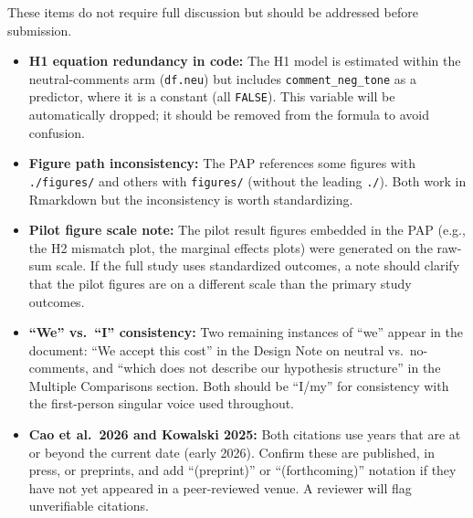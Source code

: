 \documentclass[11pt]{article}
\begin{document}
These items do not require full discussion but should be addressed before submission.

\begin{itemize}
  \item \textbf{H1 equation redundancy in code:} The H1 model is estimated within the neutral-comments arm (\texttt{df.neu}) but includes \texttt{comment\_neg\_tone} as a predictor, where it is a constant (all \texttt{FALSE}). This variable will be automatically dropped; it should be removed from the formula to avoid confusion.

  \item \textbf{Figure path inconsistency:} The PAP references some figures with \texttt{./figures/} and others with \texttt{figures/} (without the leading \texttt{./}). Both work in Rmarkdown but the inconsistency is worth standardizing.

  \item \textbf{Pilot figure scale note:} The pilot result figures embedded in the PAP (e.g., the H2 mismatch plot, the marginal effects plots) were generated on the raw-sum scale. If the full study uses standardized outcomes, a note should clarify that the pilot figures are on a different scale than the primary study outcomes.

  \item \textbf{``We'' vs.\ ``I'' consistency:} Two remaining instances of ``we'' appear in the document: ``We accept this cost'' in the Design Note on neutral vs.\ no-comments, and ``which does not describe our hypothesis structure'' in the Multiple Comparisons section. Both should be ``I/my'' for consistency with the first-person singular voice used throughout.

  \item \textbf{Cao et al.\ 2026 and Kowalski 2025:} Both citations use years that are at or beyond the current date (early 2026). Confirm these are published, in press, or preprints, and add ``(preprint)'' or ``(forthcoming)'' notation if they have not yet appeared in a peer-reviewed venue. A reviewer will flag unverifiable citations.
\end{itemize}
\end{document}
